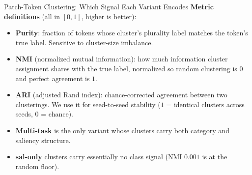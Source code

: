 \documentclass{beamer}
\begin{document}
\begin{frame}{Patch-Token Clustering: Which Signal Each Variant Encodes}
\footnotesize
{}
\vspace{2pt}
\textbf{Metric definitions} (all in $[0, 1]$, higher is better):
\begin{itemize}\setlength\itemsep{0pt}
\item \textbf{Purity}: fraction of tokens whose cluster's plurality label matches the token's true label. Sensitive to cluster-size imbalance.
\item \textbf{NMI} (normalized mutual information): how much information cluster assignment shares with the true label, normalized so random clustering is $0$ and perfect agreement is $1$.
\item \textbf{ARI} (adjusted Rand index): chance-corrected agreement between two clusterings. We use it for seed-to-seed stability ($1$ = identical clusters across seeds, $0$ = chance).
\end{itemize}
\vspace{2pt}
\begin{itemize}\setlength\itemsep{0pt}
\item \textcolor{mtblue}{\textbf{Multi-task}} is the only variant whose clusters carry both category and saliency structure.
\item \textcolor{salgreen}{\textbf{sal-only}} clusters carry essentially no class signal (NMI $0.001$ is at the random floor).
\end{itemize}
\end{frame}
\end{document}
